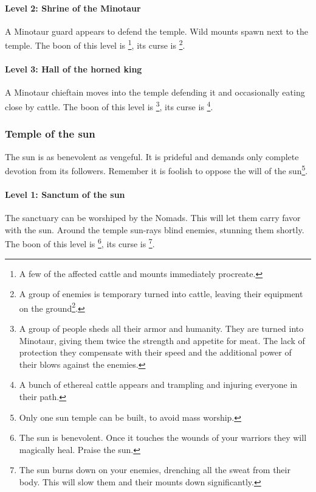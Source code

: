 \documentclass[a4paper]{book}
\begin{document}
			\paragraph{Level 2: Shrine of the Minotaur}
				A Minotaur guard appears to defend the temple.
				Wild mounts spawn next to the temple.
				The boon of this level is \footnote{
					A few of the affected cattle and mounts immediately procreate.
				},
				its curse is \footnote{
					A group of enemies is temporary turned into cattle,
					leaving their equipment on the ground\footnote{
						This means once the spell ends they are still disarmed.
					}.
				}.

			\paragraph{Level 3: Hall of the horned king}
				A Minotaur chieftain moves into the temple defending it
				and occasionally eating close by cattle.
				The boon of this level is \footnote{
					A group of people sheds all their armor and humanity.
					They are turned into Minotaur, giving them twice the strength
					and appetite for meat.
					The lack of protection they compensate with their speed and the additional
					power of their blows against the enemies.
				},
				its curse is \footnote{
					A bunch of ethereal cattle appears and trampling and injuring everyone in their path.
				}.

		\subsubsection{Temple of the sun}
			The sun is as benevolent as vengeful.
			It is prideful and demands only complete devotion from its followers.
			Remember it is foolish to oppose the will of the sun\footnote{
				Only one sun temple can be built, to avoid mass worship.
			}.

			\paragraph{Level 1: Sanctum of the sun}
				The sanctuary can be worshiped by the \gls{Nomads}.
				This will let them carry favor with the sun.
				Around the temple sun-rays blind enemies, stunning them shortly.
				The boon of this level is \footnote{
					The sun is benevolent.
					Once it touches the wounds of your warriors they will magically heal.
					Praise the sun.
				},
				its curse is \footnote{
					The sun burns down on your enemies, drenching all the sweat from their body.
					This will slow them and their mounts down significantly.
				}.
\end{document}
